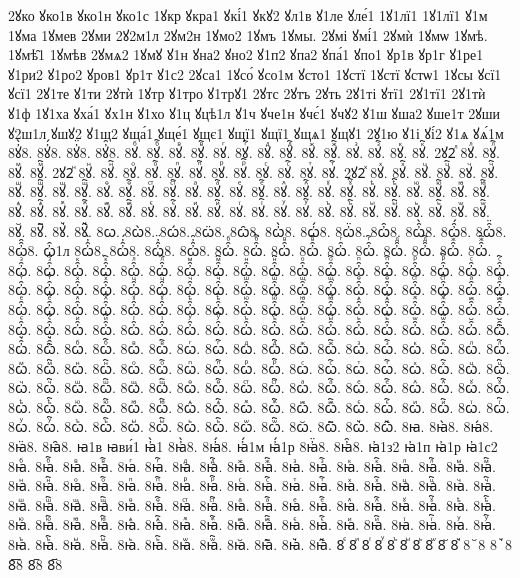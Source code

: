 {2ꙋко
ꙋко1в
ꙋко1н
ꙋко1с
1ꙋкр
ꙋкра1
ꙋкі́1
ꙋкꙋ2
ꙋл1в
ꙋ1ле
ꙋле́1
1ꙋ1лї1
1ꙋ1лї1
ꙋ1м
1ꙋма
1ꙋмев
2ꙋми
2ꙋ2м1л
2ꙋм2н
1ꙋмо2
1ꙋмъ
1ꙋмы.
2ꙋмі
ꙋмі́1
2ꙋмѝ
1ꙋмѡ
1ꙋмѣ.
1ꙋмѣ̑1
1ꙋмѣв
2ꙋмѧ2
1ꙋмꙋ
ꙋ1н
ꙋна2
ꙋно2
ꙋ1п2
ꙋпа2
ꙋпа́1
ꙋпо1
ꙋр1в
ꙋр1г
ꙋ1ре1
ꙋ1ри2
ꙋ1ро2
ꙋров1
ꙋр1т
ꙋ1с2
2ꙋса1
1ꙋсо́
ꙋсо1м
ꙋсто1
1ꙋстї
1ꙋстї
ꙋстѡ1
1ꙋсы
ꙋсї1
ꙋсї1
2ꙋ1те
ꙋ1ти
2ꙋтѝ
1ꙋтр
ꙋ1тро
ꙋ1трꙋ1
2ꙋтс
2ꙋтъ
2ꙋть
2ꙋ1ті
ꙋтї1
2ꙋ1тї1
2ꙋ1тѝ
ꙋ1ф
1ꙋ1ха
ꙋха́1
ꙋх1н
ꙋ1хо
ꙋ1ц
ꙋцѣ1л
ꙋ1ч
ꙋче1н
ꙋчє́1
ꙋчꙋ2
ꙋ1ш
ꙋша2
ꙋше1т
2ꙋши
ꙋ2ш1л
ꙋшꙋ2
ꙋ1щ2
ꙋща́1
ꙋще́1
ꙋщє1
ꙋщї1
ꙋщї1
ꙋщѧ1
ꙋщꙋ1
2ꙋ1ю
ꙋ1і
ꙋі́2
ꙋ1ѧ
ꙋѧ́1м
8ꙋ҆̀8.
8ꙋ҆́8.
8ꙋ҆̈8.
8ꙋ҆̑8.
8ꙋⷠ.
8ꙋⷠ҇.
8ꙋⷡ.
8ꙋⷡ҇.
8ꙋⷢ.
8ꙋⷢ҇.
8ꙋⷣ.
8ꙋⷣ҇.
8ꙋⷤ.
8ꙋⷤ҇.
8ꙋⷥ.
8ꙋⷥ҇.
8ꙋⷦ.
8ꙋⷦ҇.
2ꙋ2ⷧ
8ꙋⷧ.
8ꙋⷧ҇.
8ꙋⷨ.
8ꙋⷨ҇.
2ꙋ2ⷩ
8ꙋⷩ.
8ꙋⷩ҇.
8ꙋⷪ.
8ꙋⷪ҇.
8ꙋⷫ.
8ꙋⷫ҇.
8ꙋⷬ.
8ꙋⷬ҇.
8ꙋⷭ.
8ꙋⷭ҇.
8ꙋⷮ.
8ꙋⷮ҇.
2ꙋ2ⷯ
8ꙋⷯ.
8ꙋⷯ҇.
8ꙋⷰ.
8ꙋⷰ҇.
8ꙋⷱ.
8ꙋⷱ҇.
8ꙋⷲ.
8ꙋⷲ҇.
8ꙋⷳ.
8ꙋⷳ҇.
8ꙋⷴ.
8ꙋⷴ҇.
8ꙋⷵ.
8ꙋⷵ҇.
8ꙋⷶ.
8ꙋⷶ҇.
8ꙋⷷ.
8ꙋⷷ҇.
8ꙋⷸ.
8ꙋⷸ҇.
8ꙋⷹ.
8ꙋⷹ҇.
8ꙋⷺ.
8ꙋⷺ҇.
8ꙋⷻ.
8ꙋⷻ҇.
8ꙋⷼ.
8ꙋⷼ҇.
8ꙋⷽ.
8ꙋⷽ҇.
8ꙋⷾ.
8ꙋⷾ҇.
8ꙋⷿ.
8ꙋⷿ҇.
8ꙋꙴ.
8ꙋꙴ҇.
8ꙋꙵ.
8ꙋꙵ҇.
8ꙋꙶ.
8ꙋꙶ҇.
8ꙋꙷ.
8ꙋꙷ҇.
8ꙋꙸ.
8ꙋꙸ҇.
8ꙋꙹ.
8ꙋꙹ҇.
8ꙋꙺ.
8ꙋꙺ҇.
8ꙋꙻ.
8ꙋꙻ҇.
8ꙋ꙼.
8ꙋ꙼҇.
8ꙋ꙽.
8ꙋ꙽҇.
8ꙍ.
8ꙍ̀8.
8ꙍ́8.
8ꙍ̈8.
8ꙍ̑8.
8ꙍ҆̀8.
8ꙍ҆́8.
8ꙍ҆̈8.
8ꙍ҆̑8.
8ꙍ҆̑̀8.
8ꙍ҆̑́8.
8ꙍ҆̑̈8.
8ꙍ҆̑̑8.
ꙍ҆̑1л
8ꙍ҆̑҆̀8.
8ꙍ҆̑҆́8.
8ꙍ҆̑҆̈8.
8ꙍ҆̑҆̑8.
8ꙍ҆̑ⷠ.
8ꙍ҆̑ⷠ҇.
8ꙍ҆̑ⷡ.
8ꙍ҆̑ⷡ҇.
8ꙍ҆̑ⷢ.
8ꙍ҆̑ⷢ҇.
8ꙍ҆̑ⷣ.
8ꙍ҆̑ⷣ҇.
8ꙍ҆̑ⷤ.
8ꙍ҆̑ⷤ҇.
8ꙍ҆̑ⷥ.
8ꙍ҆̑ⷥ҇.
8ꙍ҆̑ⷦ.
8ꙍ҆̑ⷦ҇.
8ꙍ҆̑ⷧ.
8ꙍ҆̑ⷧ҇.
8ꙍ҆̑ⷨ.
8ꙍ҆̑ⷨ҇.
8ꙍ҆̑ⷩ.
8ꙍ҆̑ⷩ҇.
8ꙍ҆̑ⷪ.
8ꙍ҆̑ⷪ҇.
8ꙍ҆̑ⷫ.
8ꙍ҆̑ⷫ҇.
8ꙍ҆̑ⷬ.
8ꙍ҆̑ⷬ҇.
8ꙍ҆̑ⷭ.
8ꙍ҆̑ⷭ҇.
8ꙍ҆̑ⷮ.
8ꙍ҆̑ⷮ҇.
8ꙍ҆̑ⷯ.
8ꙍ҆̑ⷯ҇.
8ꙍ҆̑ⷰ.
8ꙍ҆̑ⷰ҇.
8ꙍ҆̑ⷱ.
8ꙍ҆̑ⷱ҇.
8ꙍ҆̑ⷲ.
8ꙍ҆̑ⷲ҇.
8ꙍ҆̑ⷳ.
8ꙍ҆̑ⷳ҇.
8ꙍ҆̑ⷴ.
8ꙍ҆̑ⷴ҇.
8ꙍ҆̑ⷵ.
8ꙍ҆̑ⷵ҇.
8ꙍ҆̑ⷶ.
8ꙍ҆̑ⷶ҇.
8ꙍ҆̑ⷷ.
8ꙍ҆̑ⷷ҇.
8ꙍ҆̑ⷸ.
8ꙍ҆̑ⷸ҇.
8ꙍ҆̑ⷹ.
8ꙍ҆̑ⷹ҇.
8ꙍ҆̑ⷺ.
8ꙍ҆̑ⷺ҇.
8ꙍ҆̑ⷻ.
8ꙍ҆̑ⷻ҇.
8ꙍ҆̑ⷼ.
8ꙍ҆̑ⷼ҇.
8ꙍ҆̑ⷽ.
8ꙍ҆̑ⷽ҇.
8ꙍ҆̑ⷾ.
8ꙍ҆̑ⷾ҇.
8ꙍ҆̑ⷿ.
8ꙍ҆̑ⷿ҇.
8ꙍ҆̑ꙴ.
8ꙍ҆̑ꙴ҇.
8ꙍ҆̑ꙵ.
8ꙍ҆̑ꙵ҇.
8ꙍ҆̑ꙶ.
8ꙍ҆̑ꙶ҇.
8ꙍ҆̑ꙷ.
8ꙍ҆̑ꙷ҇.
8ꙍ҆̑ꙸ.
8ꙍ҆̑ꙸ҇.
8ꙍ҆̑ꙹ.
8ꙍ҆̑ꙹ҇.
8ꙍ҆̑ꙺ.
8ꙍ҆̑ꙺ҇.
8ꙍ҆̑ꙻ.
8ꙍ҆̑ꙻ҇.
8ꙍ҆̑꙼.
8ꙍ҆̑꙼҇.
8ꙍ҆̑꙽.
8ꙍ҆̑꙽҇.
8ꙍⷠ.
8ꙍⷠ҇.
8ꙍⷡ.
8ꙍⷡ҇.
8ꙍⷢ.
8ꙍⷢ҇.
8ꙍⷣ.
8ꙍⷣ҇.
8ꙍⷤ.
8ꙍⷤ҇.
8ꙍⷥ.
8ꙍⷥ҇.
8ꙍⷦ.
8ꙍⷦ҇.
8ꙍⷧ.
8ꙍⷧ҇.
8ꙍⷨ.
8ꙍⷨ҇.
8ꙍⷩ.
8ꙍⷩ҇.
8ꙍⷪ.
8ꙍⷪ҇.
8ꙍⷫ.
8ꙍⷫ҇.
8ꙍⷬ.
8ꙍⷬ҇.
8ꙍⷭ.
8ꙍⷭ҇.
8ꙍⷮ.
8ꙍⷮ҇.
8ꙍⷯ.
8ꙍⷯ҇.
8ꙍⷰ.
8ꙍⷰ҇.
8ꙍⷱ.
8ꙍⷱ҇.
8ꙍⷲ.
8ꙍⷲ҇.
8ꙍⷳ.
8ꙍⷳ҇.
8ꙍⷴ.
8ꙍⷴ҇.
8ꙍⷵ.
8ꙍⷵ҇.
8ꙍⷶ.
8ꙍⷶ҇.
8ꙍⷷ.
8ꙍⷷ҇.
8ꙍⷸ.
8ꙍⷸ҇.
8ꙍⷹ.
8ꙍⷹ҇.
8ꙍⷺ.
8ꙍⷺ҇.
8ꙍⷻ.
8ꙍⷻ҇.
8ꙍⷼ.
8ꙍⷼ҇.
8ꙍⷽ.
8ꙍⷽ҇.
8ꙍⷾ.
8ꙍⷾ҇.
8ꙍⷿ.
8ꙍⷿ҇.
8ꙍꙴ.
8ꙍꙴ҇.
8ꙍꙵ.
8ꙍꙵ҇.
8ꙍꙶ.
8ꙍꙶ҇.
8ꙍꙷ.
8ꙍꙷ҇.
8ꙍꙸ.
8ꙍꙸ҇.
8ꙍꙹ.
8ꙍꙹ҇.
8ꙍꙺ.
8ꙍꙺ҇.
8ꙍꙻ.
8ꙍꙻ҇.
8ꙍ꙼.
8ꙍ꙼҇.
8ꙍ꙽.
8ꙍ꙽҇.
8ꙗ.
8ꙗ̀8.
8ꙗ́8.
8ꙗ̈8.
8ꙗ̑8.
ꙗ1в
ꙗви́1
ꙗ҆̀1
8ꙗ҆̀8.
8ꙗ҆́8.
ꙗ҆́1м
ꙗ҆́1р
8ꙗ҆̈8.
8ꙗ҆̑8.
ꙗ҆1з2
ꙗ҆1п
ꙗ҆1р
ꙗ҆1с2
8ꙗⷠ.
8ꙗⷠ҇.
8ꙗⷡ.
8ꙗⷡ҇.
8ꙗⷢ.
8ꙗⷢ҇.
8ꙗⷣ.
8ꙗⷣ҇.
8ꙗⷤ.
8ꙗⷤ҇.
8ꙗⷥ.
8ꙗⷥ҇.
8ꙗⷦ.
8ꙗⷦ҇.
8ꙗⷧ.
8ꙗⷧ҇.
8ꙗⷨ.
8ꙗⷨ҇.
8ꙗⷩ.
8ꙗⷩ҇.
8ꙗⷪ.
8ꙗⷪ҇.
8ꙗⷫ.
8ꙗⷫ҇.
8ꙗⷬ.
8ꙗⷬ҇.
8ꙗⷭ.
8ꙗⷭ҇.
8ꙗⷮ.
8ꙗⷮ҇.
8ꙗⷯ.
8ꙗⷯ҇.
8ꙗⷰ.
8ꙗⷰ҇.
8ꙗⷱ.
8ꙗⷱ҇.
8ꙗⷲ.
8ꙗⷲ҇.
8ꙗⷳ.
8ꙗⷳ҇.
8ꙗⷴ.
8ꙗⷴ҇.
8ꙗⷵ.
8ꙗⷵ҇.
8ꙗⷶ.
8ꙗⷶ҇.
8ꙗⷷ.
8ꙗⷷ҇.
8ꙗⷸ.
8ꙗⷸ҇.
8ꙗⷹ.
8ꙗⷹ҇.
8ꙗⷺ.
8ꙗⷺ҇.
8ꙗⷻ.
8ꙗⷻ҇.
8ꙗⷼ.
8ꙗⷼ҇.
8ꙗⷽ.
8ꙗⷽ҇.
8ꙗⷾ.
8ꙗⷾ҇.
8ꙗⷿ.
8ꙗⷿ҇.
8ꙗꙴ.
8ꙗꙴ҇.
8ꙗꙵ.
8ꙗꙵ҇.
8ꙗꙶ.
8ꙗꙶ҇.
8ꙗꙷ.
8ꙗꙷ҇.
8ꙗꙸ.
8ꙗꙸ҇.
8ꙗꙹ.
8ꙗꙹ҇.
8ꙗꙺ.
8ꙗꙺ҇.
8ꙗꙻ.
8ꙗꙻ҇.
8ꙗ꙼.
8ꙗ꙼҇.
8ꙗ꙽.
8ꙗ꙽҇.
8ꙴ
8ꙵ
8ꙶ
8ꙷ
8ꙸ
8ꙹ
8ꙺ
8ꙻ
8꙼
8꙽
8꙾8
8ꙿ8
8︦8
8︮8
8︯8
}
